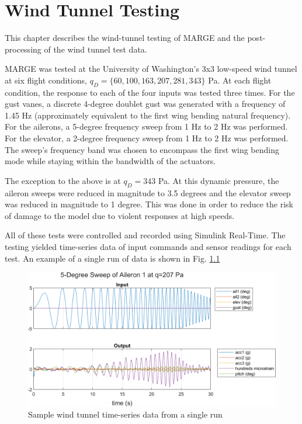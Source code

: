 \chapter{Wind Tunnel Testing}
\label{ch:windTunnel}
\label{sec:wtDAQ}

This chapter describes the wind-tunnel testing of MARGE and the post-processing of the wind tunnel test data.

MARGE was tested at the University of Washington's 3x3 low-speed wind tunnel at six flight conditions, $q_D=\{60,100,163,207,281,343\}$ Pa. At each flight condition, the response to each of the four inputs was tested three times. For the gust vanes, a discrete 4-degree doublet gust was generated with a frequency of 1.45 Hz (approximately equivalent to the first wing bending natural frequency). For the ailerons, a 5-degree frequency sweep from 1 Hz to 2 Hz was performed. For the elevator, a 2-degree frequency sweep from 1 Hz to 2 Hz was performed. The sweep's frequency band was chosen to encompass the first wing bending mode while staying within the bandwidth of the actuators.

The exception to the above is at $q_D=343$ Pa. At this dynamic pressure, the aileron sweeps were reduced in magnitude to 3.5 degrees and the elevator sweep was reduced in magnitude to 1 degree. This was done in order to reduce the risk of damage to the model due to violent responses at high speeds.

All of these tests were controlled and recorded using Simulink Real-Time. The testing yielded time-series data of input commands and sensor readings for each test. An example of a single run of data is shown in Fig. \ref{fig:sampleWT}
\begin{figure}[H]
	\centering
	\includegraphics[width=6in]{figs/sampleWT.png}
	\caption{Sample wind tunnel time-series data from a single run}
	\label{fig:sampleWT}
\end{figure}

